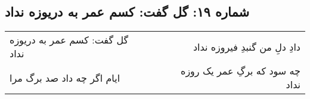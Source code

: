 \begin{center}
\section*{شماره ۱۹: گل گفت: کسم عمر به دریوزه نداد}
\label{sec:019}
\begin{longtable}{l p{0.5cm} r}
گل گفت: کسم عمر به دریوزه نداد
&&
دادِ دلِ من گنبدِ فیروزه نداد
\\
ایام اگر چه داد صد برگ مرا
&&
چه سود که برگِ عمر یک روزه نداد
\\
\end{longtable}
\end{center}
